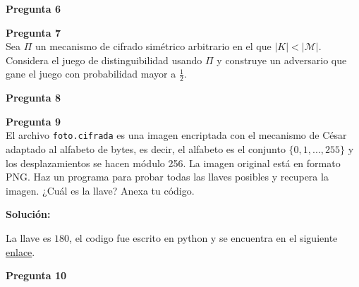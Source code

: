 \documentclass{article}
\newenvironment{problem}[2][Pregunta]
    { \begin{mdframed}[backgroundcolor=gray!20] \textbf{#1 #2} \\}
    {  \end{mdframed}}
\begin{document}
\begin{problem}{6}
  
\end{problem}

\begin{problem}{7}
  Sea $\Pi$ un mecanismo de cifrado simétrico arbitrario en el que $|K| < |\mathcal{M}|$.
  Considera el juego de distinguibilidad usando $\Pi$ y construye un adversario que gane
  el juego con probabilidad mayor a $\frac{1}{2}$.
\end{problem}

\begin{problem}{8}
  
\end{problem}

\begin{problem}{9}
  El archivo {\tt foto.cifrada} es una imagen encriptada con el mecanismo de César adaptado al
  alfabeto de bytes, es decir, el alfabeto es el conjunto $\{0,1,. . ., 255\}$ y los
  desplazamientos se hacen módulo 256. La imagen original está en formato PNG. Haz un programa
  para probar todas las llaves posibles y recupera la imagen. ¿Cuál es la llave? Anexa tu código.
\end{problem}

{\bf Solución:}

La llave es $180$, el codigo fue escrito en python y se encuentra en el siguiente
\href{https://github.com/DiegoMendezMedina/Cripto-Seguridad/tree/main/Tareas/01/src/9.py}{enlace}.

\begin{problem}{10}
  
\end{problem}
\end{document}
